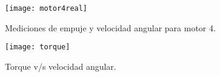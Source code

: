 \documentclass[\main/main.tex]{subfiles}
\begin{document}
\begin{figure}
\begin{centering}
\texttt{[image: motor4real]}
\par\end{centering}
\caption{Mediciones de empuje y velocidad angular para motor 4.}
\end{figure}

\begin{figure}
\begin{centering}
\texttt{[image: torque]}
\par\end{centering}
\caption{Torque v/s velocidad angular.}
\end{figure}
\end{document}
